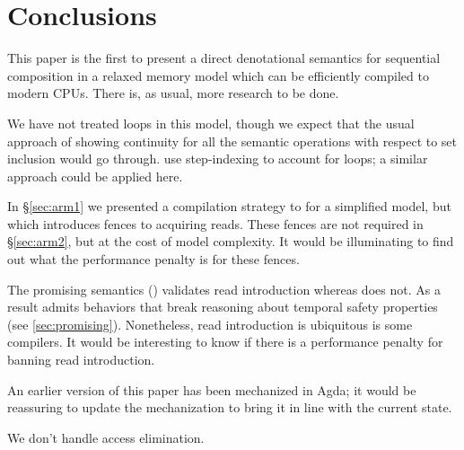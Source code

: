\section{Conclusions} %

This paper is the first to present a direct denotational semantics for
sequential composition in a relaxed memory model which can be
efficiently compiled to modern CPUs. There is, as usual, more research
to be done.

We have not treated loops in this model, though we expect that the usual
approach of showing continuity for all the semantic operations with respect to set inclusion
would go through. \citet{DBLP:conf/esop/PaviottiCPWOB20} use step-indexing to account for
loops; a similar approach could be applied here.

In \S\ref{sec:arm1} we presented a compilation strategy to \armeight{}
for a simplified model, but which introduces fences to acquiring
reads. These fences are not required in \S\ref{sec:arm2}, but at the
cost of model complexity. It would be illuminating to find out what
the performance penalty is for these fences.

The promising semantics (\PS{}) validates read introduction whereas \PwT{}
does not.  As a result \PS{} admits behaviors that break reasoning about
temporal safety properties (see \textsection\ref{sec:promising}).
Nonetheless, read introduction is ubiquitous is some compilers.  It would be
interesting to know if there is a performance penalty for banning read
introduction.

An earlier version of this paper has been mechanized in Agda; it would be
reassuring to update the mechanization to bring it in line with the current state.

We don't handle access elimination.



